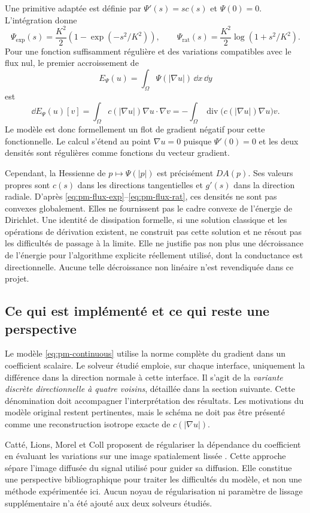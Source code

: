 Une primitive adaptée est définie par $\Psi'(s)=s c(s)$ et
$\Psi(0)=0$. L'intégration donne
\begin{equation}
 \Psi_{\mathrm{exp}}(s)=\frac{K^2}{2}
    \left(1-\exp(-s^2/K^2)\right),\qquad
 \Psi_{\mathrm{rat}}(s)=\frac{K^2}{2}
    \log\left(1+s^2/K^2\right).
 \label{eq:pm-potentials}
\end{equation}
Pour une fonction suffisamment régulière et des variations compatibles
avec le flux nul, le premier accroissement de
\begin{equation}
 E_\Psi(u)=\int_\Omega\Psi(|\nabla u|)\,\dd x\,\dd y
 \label{eq:pm-energy-formal}
\end{equation}
est
\begin{equation}
 \dd E_\Psi(u)[v]
 =\int_\Omega c(|\nabla u|)\nabla u\cdot\nabla v
 =-\int_\Omega
    \operatorname{div}\bigl(c(|\nabla u|)\nabla u\bigr)v.
 \label{eq:pm-firstvariation}
\end{equation}
Le modèle est donc formellement un flot de gradient négatif pour
cette fonctionnelle. Le calcul s'étend au point $\nabla u=0$ puisque
$\Psi'(0)=0$ et les deux densités sont régulières comme fonctions
du vecteur gradient.

Cependant, la Hessienne de $p\mapsto\Psi(|p|)$ est précisément
$D A(p)$. Ses valeurs propres sont $c(s)$ dans les directions
tangentielles et $g'(s)$ dans la direction radiale. D'après
\eqref{eq:pm-flux-exp}--\eqref{eq:pm-flux-rat}, ces densités ne sont
pas convexes globalement. Elles ne fournissent pas le cadre convexe
de l'énergie de Dirichlet. Une identité de dissipation formelle, si
une solution classique et les opérations de dérivation existent,
ne construit pas cette solution et ne résout pas les difficultés
de passage à la limite. Elle ne justifie pas non plus une décroissance
de l'énergie pour l'algorithme explicite réellement utilisé, dont la
conductance est directionnelle. Aucune telle décroissance non linéaire
n'est revendiquée dans ce projet.

\subsection{Ce qui est implémenté et ce qui reste une perspective}

Le modèle \eqref{eq:pm-continuous} utilise la norme complète du
gradient dans un coefficient scalaire. Le solveur étudié emploie,
sur chaque interface, uniquement la différence dans la direction
normale à cette interface. Il s'agit de la \emph{variante discrète
directionnelle à quatre voisins}, détaillée dans la section suivante.
Cette dénomination doit accompagner l'interprétation des résultats.
Les motivations du modèle original restent pertinentes, mais le
schéma ne doit pas être présenté comme une reconstruction isotrope
exacte de $c(|\nabla u|)$.

Catté, Lions, Morel et Coll proposent de régulariser la dépendance
du coefficient en évaluant les variations sur une image spatialement
lissée \cite{catte1992}. Cette approche sépare l'image diffusée du
signal utilisé pour guider sa diffusion. Elle constitue une
perspective bibliographique pour traiter les difficultés du modèle,
et non une méthode expérimentée ici. Aucun noyau de régularisation
ni paramètre de lissage supplémentaire n'a été ajouté aux deux
solveurs étudiés.
